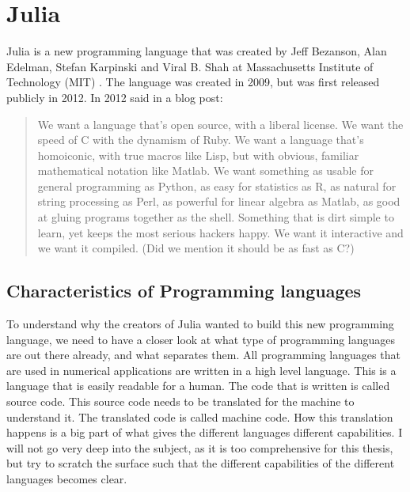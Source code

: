 \chapter{Julia}
\label{ch:Julia}
Julia is a new programming language that was created by Jeff Bezanson, Alan Edelman, Stefan Karpinski and Viral B. Shah at Massachusetts Institute of Technology (MIT) \citep{juliaLab}. The language was created in 2009, but was first released publicly in 2012. In 2012 \cite{juliaBlogRelease2012} said in a blog post:
\blockquote{We want a language that’s open source, with a liberal license. We want the speed of C with the dynamism of Ruby. We want a language that’s homoiconic, with true macros like Lisp, but with obvious, familiar mathematical notation like Matlab. We want something as usable for general programming as Python, as easy for statistics as R, as natural for string processing as Perl, as powerful for linear algebra as Matlab, as good at gluing programs together as the shell. Something that is dirt simple to learn, yet keeps the most serious hackers happy. We want it interactive and we want it compiled. (Did we mention it should be as fast as C?)}

\section{Characteristics of Programming languages}
To understand why the creators of Julia wanted to build this new programming language, we need to have a closer look at what type of programming languages are out there already, and what separates them. All programming languages that are used in numerical applications are written in a high level language. This is a language that is easily readable for a human. The code that is written is called source code. This source code needs to be translated for the machine to understand it. The translated code is called machine code. How this translation happens is a big part of what gives the different languages different capabilities. I will not go very deep into the subject, as it is too comprehensive for this thesis, but try to scratch the surface such that the different capabilities of the different languages becomes clear.

